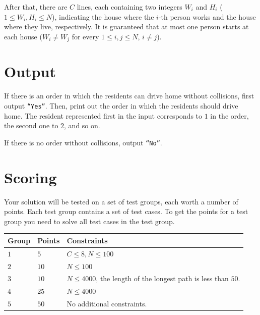 After that, there are $C$ lines, each containing two integers $W_i$ and $H_i$ ($1 \leq W_i,H_i \leq N$), indicating the
house where the $i$-th person works and the house where they live, respectively. It is guaranteed that at most one person
starts at each house ($W_i \neq W_j$ for every $1 \leq i, j \leq N$, $i \neq j$).

\section*{Output}
If there is an order in which the residents can drive home without collisions, first output \texttt{``Yes''}.
Then, print out the order in which the residents should drive home. The resident represented first in the
input corresponds to $1$ in the order, the second one to $2$, and so on.

If there is no order without collisions, output \texttt{``No''}.

\section*{Scoring}
Your solution will be tested on a set of test groups, each worth a number of points. Each test group contains
a set of test cases. To get the points for a test group you need to solve all test cases in the test group.

\noindent
\begin{tabular}{| l | l | p{12cm} |}
  \hline
  \textbf{Group} & \textbf{Points} & \textbf{Constraints} \\ \hline
  $1$    & $5$        & $C \leq 8, N \leq 100$ \\ \hline
  $2$    & $10$       & $N \leq 100$ \\ \hline
  $3$    & $10$       & $N \leq 4000$, the length of the longest path is less than $50$. \\ \hline
  $4$    & $25$       & $N \leq 4000$ \\ \hline
  $5$    & $50$       & No additional constraints. \\ \hline
\end{tabular}

